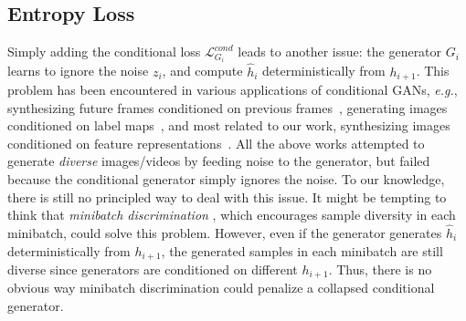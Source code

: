 \documentclass[10pt,twocolumn,letterpaper]{article}
\begin{document}
\subsection{Entropy Loss}
\label{Entloss}
Simply adding the conditional loss $\mathcal{L}_{G_{i}}^{cond}$ leads to another issue: the generator $G_{i}$ learns to ignore the noise $z_{i}$, and compute  $\hat{h}_{i}$ deterministically from $h_{i+1}$. 
This problem has been encountered in various applications of conditional GANs, \emph{e.g.}, synthesizing future frames conditioned on previous frames~\cite{mathieu2016deep}, generating images conditioned on label maps~\cite{pix2pix2016}, and most related to our work, synthesizing images conditioned on feature representations~\cite{dosovitskiy2016generating}. All the above works attempted to generate \emph{diverse} images/videos by feeding noise to the generator, but failed because the conditional generator simply ignores the noise. To our knowledge, there is still no principled way to deal with this issue.
It might be tempting to think that \emph{minibatch discrimination} \cite{salimans2016improved}, which encourages sample diversity in each minibatch, could solve this problem. However, even if the generator generates  $\hat{h}_{i}$ deterministically from $h_{i+1}$, the generated samples in each minibatch are still diverse since generators are conditioned on different $h_{i+1}$. Thus, there is no obvious way minibatch discrimination could penalize a collapsed conditional generator.
\end{document}

